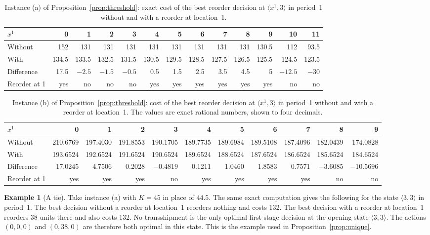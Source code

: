 \documentclass[11pt]{article}
\theoremstyle{definition}
\newtheorem{illustration}{Example}
\begin{document}
\begin{table}[h]
\centering
\footnotesize
\setlength{\tabcolsep}{3.2pt}
\caption{Instance (a) of Proposition~\ref{prop:threshold}: exact cost of the best reorder decision at $\langle x^1,3\rangle$ in period~1 without and with a reorder at location~1.}\label{tab:det}
\begin{tabular}{lrrrrrrrrrrrr}
\toprule
$x^1$ & 0 & 1 & 2 & 3 & 4 & 5 & 6 & 7 & 8 & 9 & 10 & 11 \\
\midrule
Without & 152 & 131 & 131 & 131 & 131 & 131 & 131 & 131 & 131 & 130.5 & 112 & 93.5 \\
With & 134.5 & 133.5 & 132.5 & 131.5 & 130.5 & 129.5 & 128.5 & 127.5 & 126.5 & 125.5 & 124.5 & 123.5 \\
Difference & 17.5 & $-2.5$ & $-1.5$ & $-0.5$ & 0.5 & 1.5 & 2.5 & 3.5 & 4.5 & 5 & $-12.5$ & $-30$ \\
Reorder at 1 & yes & no & no & no & yes & yes & yes & yes & yes & yes & no & no \\
\bottomrule
\end{tabular}
\end{table}

\begin{table}[h]
\centering
\footnotesize
\setlength{\tabcolsep}{2.0pt}
\caption{Instance (b) of Proposition~\ref{prop:threshold}: cost of the best reorder decision at $\langle x^1,3\rangle$ in period~1 without and with a reorder at location~1. The values are exact rational numbers, shown to four decimals.}\label{tab:threshold}
\begin{tabular}{lrrrrrrrrrr}
\toprule
$x^1$ & 0 & 1 & 2 & 3 & 4 & 5 & 6 & 7 & 8 & 9 \\
\midrule
Without & 210.6769 & 197.4030 & 191.8553 & 190.1705 & 189.7735 & 189.6984 & 189.5108 & 187.4096 & 182.0439 & 174.0828 \\
With & 193.6524 & 192.6524 & 191.6524 & 190.6524 & 189.6524 & 188.6524 & 187.6524 & 186.6524 & 185.6524 & 184.6524 \\
Difference & 17.0245 & 4.7506 & 0.2028 & $-0.4819$ & 0.1211 & 1.0460 & 1.8583 & 0.7571 & $-3.6085$ & $-10.5696$ \\
Reorder at 1 & yes & yes & yes & no & yes & yes & yes & yes & no & no \\
\bottomrule
\end{tabular}
\end{table}

\begin{illustration}[A tie]\label{ex:tie}
Take instance (a) with $K=45$ in place of $44.5$. The same exact computation gives the following for the state $\langle3,3\rangle$ in period~1. The best decision without a reorder at location~1 reorders nothing and costs 132. The best decision with a reorder at location~1 reorders 38 units there and also costs 132. No transshipment is the only optimal first-stage decision at the opening state $\langle3,3\rangle$. The actions $(0,0,0)$ and $(0,38,0)$ are therefore both optimal in this state. This is the example used in Proposition~\ref{prop:unique}.
\end{illustration}
\end{document}
